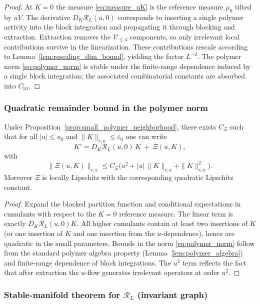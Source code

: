 \begin{proof}
At $K=0$ the measure \eqref{eq:measure_uK} is the reference measure $\mu_0$ tilted by $uV$.
The derivative $D_K\mathcal R_L(u,0)$ corresponds to inserting a single polymer activity into the block integration and propagating it through
blocking and extraction.
Extraction removes the $\mathscr V_{\le 4}$ components, so only irrelevant local contributions survive in the linearization.
These contributions rescale according to Lemma~\ref{lem:rescaling_dim_bound}, yielding the factor $L^{-2}$.
The polymer norm \eqref{eq:polymer_norm} is stable under the finite-range dependence induced by a single block integration; the associated
combinatorial constants are absorbed into $C_{\mathrm{irr}}$.
\end{proof}

\subsubsection{Quadratic remainder bound in the polymer norm}
\label{subsec:quadratic_remainder}

\begin{proposition}\label{prop:quadratic_remainder_polymer}
Under Proposition~\ref{prop:small_polymer_neighborhood}, there exists $C_{\Xi}$ such that for all $|u|\le u_0$ and
$\|K\|_{r,\kappa}\le \varepsilon_0$ one can write
\[
K' = D_K\mathcal R_L(u,0)\,K\ +\ \Xi(u,K),
\]
with
\[
\|\Xi(u,K)\|_{r,\kappa}
\le C_{\Xi}\bigl(u^2+|u|\,\|K\|_{r,\kappa}+\|K\|_{r,\kappa}^2\bigr).
\]
Moreover $\Xi$ is locally Lipschitz with the corresponding quadratic Lipschitz constant.
\end{proposition}

\begin{proof}
Expand the blocked partition function and conditional expectations in cumulants with respect to the $K=0$ reference measure.
The linear term is exactly $D_K\mathcal R_L(u,0)K$.
All higher cumulants contain at least two insertions of $K$ (or one insertion of $K$ and one insertion from the $u$-dependence), hence are
quadratic in the small parameters.
Bounds in the norm \eqref{eq:polymer_norm} follow from the standard polymer algebra property (Lemma~\ref{lem:polymer_algebra}) and
finite-range dependence of block integrations.
The $u^2$ term reflects the fact that after extraction the $u$-flow generates irrelevant operators at order $u^2$.
\end{proof}

\subsubsection{Stable-manifold theorem for \texorpdfstring{$\mathcal R_L$}{R\_L} (invariant graph)}
\label{subsec:stable_manifold_theorem}

